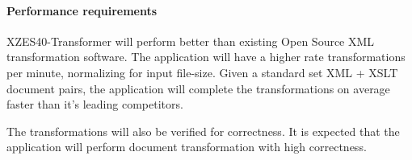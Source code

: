 \paragraph{Performance requirements}
%

XZES40-Transformer will perform better than existing Open Source XML transformation software.
The application will have a higher rate transformations per minute, normalizing for input file-size.
Given a standard set XML + XSLT document pairs, the application will complete the transformations on average faster than it's leading competitors.

The transformations will also be verified for correctness.
It is expected that the application will perform document transformation with high correctness.


    
